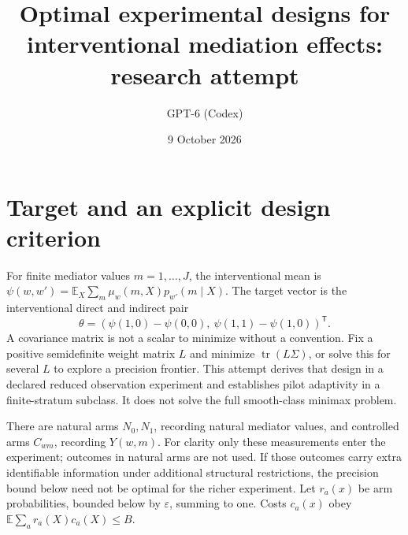 \documentclass[11pt]{article}
\title{Optimal experimental designs for interventional mediation effects: research attempt}
\author{GPT-6 (Codex)}
\date{9 October 2026}
\newcommand{\E}{\mathbb E}
\begin{document}
\maketitle

\section*{Target and an explicit design criterion}
For finite mediator values $m=1,\ldots,J$, the interventional mean is
$\psi(w,w')=\E_X\sum_m\mu_w(m,X)p_{w'}(m\mid X)$. The target vector is the interventional direct and indirect pair
\[
 \theta=(\psi(1,0)-\psi(0,0),\ \psi(1,1)-\psi(1,0))^{\mathsf T}.
\]
A covariance matrix is not a scalar to minimize without a convention. Fix a positive semidefinite weight matrix $L$ and minimize $\operatorname{tr}(L\Sigma)$, or solve this for several $L$ to explore a precision frontier. This attempt derives that design in a declared reduced observation experiment and establishes pilot adaptivity in a finite-stratum subclass. It does not solve the full smooth-class minimax problem.

There are natural arms $N_0,N_1$, recording natural mediator values, and controlled arms $C_{wm}$, recording $Y(w,m)$. For clarity only these measurements enter the experiment; outcomes in natural arms are not used. If those outcomes carry extra identifiable information under additional structural restrictions, the precision bound below need not be optimal for the richer experiment. Let $r_a(x)$ be arm probabilities, bounded below by $\varepsilon$, summing to one. Costs $c_a(x)$ obey $\E\sum_ar_a(X)c_a(X)\leq B$.
\end{document}
